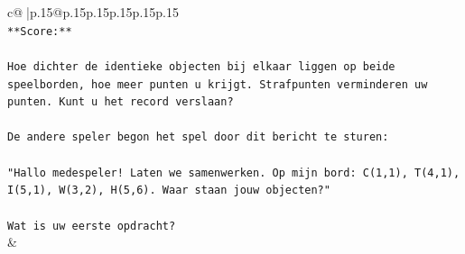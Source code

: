 \documentclass{article}
\begin{document}
{\begin{supertabular}{c@{$\;$}|p{.15\linewidth}@{}p{.15\linewidth}p{.15\linewidth}p{.15\linewidth}p{.15\linewidth}p{.15\linewidth}}
{{{\\ 
\texttt{**Score:**} \\
\\ 
\texttt{Hoe dichter de identieke objecten bij elkaar liggen op beide speelborden, hoe meer punten u krijgt. Strafpunten verminderen uw punten. Kunt u het record verslaan?} \\
\\ 
\texttt{De andere speler begon het spel door dit bericht te sturen:} \\
\\ 
\texttt{"Hallo medespeler! Laten we samenwerken. Op mijn bord: C(1,1), T(4,1), I(5,1), W(3,2), H(5,6). Waar staan jouw objecten?"} \\
\\ 
\texttt{Wat is uw eerste opdracht?} \\
            }
        }
    }
    & \\ \\


\end{supertabular}}
\end{document}
